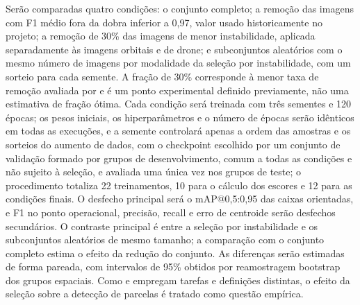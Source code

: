 Ser\~ao comparadas quatro condi\c{c}\~oes: o conjunto completo; a remo\c{c}\~ao das imagens com F1 m\'edio fora da dobra inferior a 0,97, valor usado historicamente no projeto; a remo\c{c}\~ao de 30\% das imagens de menor instabilidade, aplicada separadamente \`as imagens orbitais e de drone; e subconjuntos aleat\'orios com o mesmo n\'umero de imagens por modalidade da sele\c{c}\~ao por instabilidade, com um sorteio para cada semente. A fra\c{c}\~ao de 30\% corresponde \`a menor taxa de remo\c{c}\~ao avaliada por \citet{yagi2025} e \'e um ponto experimental definido previamente, n\~ao uma estimativa de fra\c{c}\~ao \'otima. Cada condi\c{c}\~ao ser\'a treinada com tr\^es sementes e 120 \'epocas; os pesos iniciais, os hiperpar\^ametros e o n\'umero de \'epocas ser\~ao id\^enticos em todas as execu\c{c}\~oes, e a semente controlar\'a apenas a ordem das amostras e os sorteios do aumento de dados, com o checkpoint escolhido por um conjunto de valida\c{c}\~ao formado por grupos de desenvolvimento, comum a todas as condi\c{c}\~oes e n\~ao sujeito \`a sele\c{c}\~ao, e avaliada uma \'unica vez nos grupos de teste; o procedimento totaliza 22 treinamentos, 10 para o c\'alculo dos escores e 12 para as condi\c{c}\~oes finais. O desfecho principal ser\'a o mAP@0,5:0,95 das caixas orientadas, e F1 no ponto operacional, precis\~ao, recall e erro de centroide ser\~ao desfechos secund\'arios. O contraste principal \'e entre a sele\c{c}\~ao por instabilidade e os subconjuntos aleat\'orios de mesmo tamanho; a compara\c{c}\~ao com o conjunto completo estima o efeito da redu\c{c}\~ao do conjunto. As diferen\c{c}as ser\~ao estimadas de forma pareada, com intervalos de 95\% obtidos por reamostragem bootstrap dos grupos espaciais. Como \citet{zhang2026} e \citet{yagi2025} empregam tarefas e defini\c{c}\~oes distintas, o efeito da sele\c{c}\~ao sobre a detec\c{c}\~ao de parcelas \'e tratado como quest\~ao emp\'irica.
